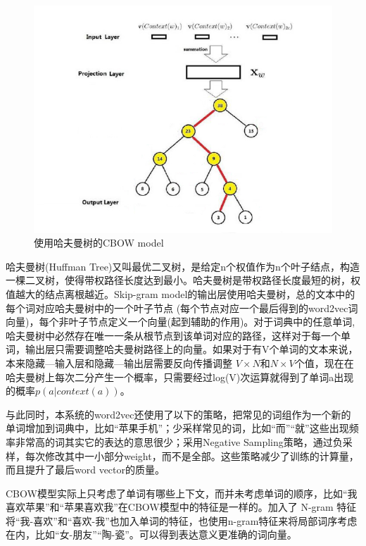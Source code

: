 \begin{figure}[!htbp]
\centering
\includegraphics[width=\linewidth,keepaspectratio]{data/chapter-1/006iXRQMzy75IEZuWeoc4&690}
\caption{使用哈夫曼树的CBOW model}
\label{figure:使用哈夫曼树的CBOW model}
\end{figure}

哈夫曼树(Huffman Tree)又叫最优二叉树，是给定n个权值作为n个叶子结点，构造一棵二叉树，使得带权路径长度达到最小。哈夫曼树是带权路径长度最短的树，权值越大的结点离根越近。Skip-gram model的输出层使用哈夫曼树，总的文本中的每个词对应哈夫曼树中的一个叶子节点 (每个节点对应一个最后得到的word2vec词向量)，每个非叶子节点定义一个向量(起到辅助的作用)。对于词典中的任意单词,哈夫曼树中必然存在唯一一条从根节点到该单词对应的路径，这样对于每一个单词，输出层只需要调整哈夫曼树路径上的向量。如果对于有V个单词的文本来说，本来隐藏—输入层和隐藏—输出层需要反向传播调整 ${V}\times{N}$和${N}\times{V}$个值，现在在哈夫曼树上每次二分产生一个概率，只需要经过log(V)次运算就得到了单词a出现的概率$p(a|context(a))$。

与此同时，本系统的word2vec还使用了以下的策略，把常见的词组作为一个新的单词增加到词典中，比如“苹果手机”；少采样常见的词，比如“而”“就”这些出现频率非常高的词其实它的表达的意思很少；采用Negative Sampling策略，通过负采样，每次修改其中一小部分weight，而不是全部。这些策略减少了训练的计算量，而且提升了最后word vector的质量。\cite{mikolov2013distributed}\cite{DBLP:journals/corr/abs-1301-3781}\cite{DBLP:journals/corr/abs-1801-10198}

CBOW模型实际上只考虑了单词有哪些上下文，而并未考虑单词的顺序，比如“我喜欢苹果”和“苹果喜欢我”在CBOW模型中的特征是一样的。加入了 N-gram 特征将“我-喜欢”和“喜欢-我”也加入单词的特征，也使用n-gram特征来将局部词序考虑在内，比如“女-朋友”“陶-瓷”。可以得到表达意义更准确的词向量。

